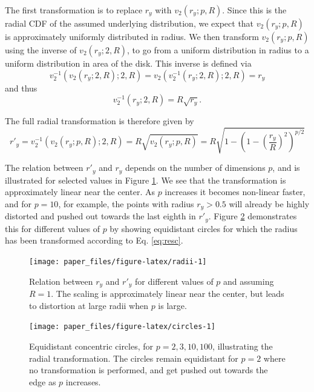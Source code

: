\documentclass[]{interact}
\theoremstyle{plain}%
\theoremstyle{definition}
\theoremstyle{remark}
\begin{document}
The first transformation is to replace \(r_y\) with
\(v_{2} (r_y; p, R)\). Since this is the radial CDF of the assumed
underlying distribution, we expect that \(v_{2} (r_y; p, R)\) is
approximately uniformly distributed in radius. We then transform
\(v_{2} (r_y; p, R)\) using the inverse of \(v_{2} (r_y; 2, R)\), to go
from a uniform distribution in radius to a uniform distribution in area
of the disk. This inverse is defined via \begin{equation}
v_2^{-1}(v_2(r_y; 2, R); 2, R) = v_2(v_2^{-1}(r_y; 2, R); 2, R) = r_y
\end{equation} and thus \begin{equation}
v_2^{-1}(r_y; 2, R) = R \sqrt{r_y}.
\end{equation}

The full radial transformation is therefore given by \begin{equation}
r'_y = v_2^{-1} (v_2(r_y; p, R); 2, R) =  R \sqrt{v_2(r_y; p, R)} = R \sqrt{1-\left(1-\left(\frac{r_y}{R}\right)^2\right)^{p/2}}
\label{eq:resc}
\end{equation}

The relation between \(r'_y\) and \(r_y\) depends on the number of
dimensions \(p\), and is illustrated for selected values in Figure
\ref{fig:radii}. We see that the transformation is approximately linear
near the center. As \(p\) increases it becomes non-linear faster, and
for \(p=10\), for example, the points with radius \(r_y>0.5\) will
already be highly distorted and pushed out towards the last eighth in
\(r'_y\). Figure \ref{fig:circles} demonstrates this for different
values of \(p\) by showing equidistant circles for which the radius has
been transformed according to Eq. \ref{eq:resc}.

\begin{figure}

{\centering \texttt{[image: paper\_files/figure-latex/radii-1]} 

}

\caption{Relation between $r_y$ and $r'_y$ for different values of $p$ and assuming $R=1$. The scaling is approximately linear near the center, but leads to distortion at large radii when $p$ is large.}\label{fig:radii}
\end{figure}

\begin{figure}

{\centering \texttt{[image: paper\_files/figure-latex/circles-1]} 

}

\caption{Equidistant concentric circles, for $p=2, 3, 10, 100$, illustrating the radial transformation. The circles remain equidistant for $p=2$ where no transformation is performed, and get pushed out towards the edge as $p$ increases.}\label{fig:circles}
\end{figure}
\end{document}
